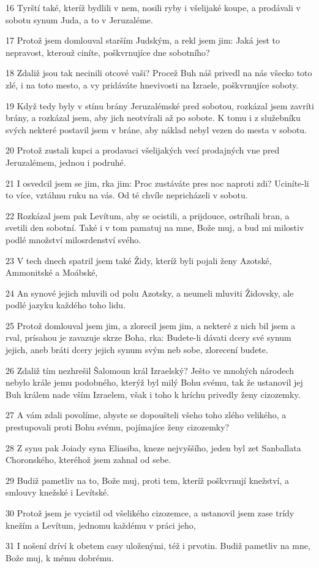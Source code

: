 \par 16 Tyrští také, kteríž bydlili v nem, nosili ryby i všelijaké koupe, a prodávali v sobotu synum Juda, a to v Jeruzaléme.
\par 17 Protož jsem domlouval starším Judským, a rekl jsem jim: Jaká jest to nepravost, kterouž ciníte, poškvrnujíce dne sobotního?
\par 18 Zdaliž jsou tak necinili otcové vaši? Procež Buh náš privedl na nás všecko toto zlé, i na toto mesto, a vy pridáváte hnevivosti na Izraele, poškvrnujíce soboty.
\par 19 Když tedy byly v stínu brány Jeruzalémské pred sobotou, rozkázal jsem zavríti brány, a rozkázal jsem, aby jich neotvírali až po sobote. K tomu i z služebníku svých nekteré postavil jsem v bráne, aby náklad nebyl vezen do mesta v sobotu.
\par 20 Protož zustali kupci a prodavaci všelijakých vecí prodajných vne pred Jeruzalémem, jednou i podruhé.
\par 21 I osvedcil jsem se jim, rka jim: Proc zustáváte pres noc naproti zdi? Uciníte-li to více, vztáhnu ruku na vás. Od té chvíle nepricházeli v sobotu.
\par 22 Rozkázal jsem pak Levítum, aby se ocistili, a prijdouce, ostríhali bran, a svetili den sobotní. Také i v tom pamatuj na mne, Bože muj, a bud mi milostiv podlé množství milosrdenství svého.
\par 23 V tech dnech spatril jsem také Židy, kteríž byli pojali ženy Azotské, Ammonitské a Moábské,
\par 24 An synové jejich mluvili od polu Azotsky, a neumeli mluviti Židovsky, ale podlé jazyku každého toho lidu.
\par 25 Protož domlouval jsem jim, a zlorecil jsem jim, a nekteré z nich bil jsem a rval, prísahou je zavazuje skrze Boha, rka: Budete-li dávati dcery své synum jejich, aneb bráti dcery jejich synum svým neb sobe, zlorecení budete.
\par 26 Zdaliž tím nezhrešil Šalomoun král Izraelský? Ješto ve mnohých národech nebylo krále jemu podobného, kterýž byl milý Bohu svému, tak že ustanovil jej Buh králem nade vším Izraelem, však i toho k hríchu privedly ženy cizozemky.
\par 27 A vám zdali povolíme, abyste se dopoušteli všeho toho zlého velikého, a prestupovali proti Bohu svému, pojímajíce ženy cizozemky?
\par 28 Z synu pak Joiady syna Eliasiba, kneze nejvyššího, jeden byl zet Sanballata Choronského, kteréhož jsem zahnal od sebe.
\par 29 Budiž pametliv na to, Bože muj, proti tem, kteríž poškvrnují knežství, a smlouvy knežské i Levítské.
\par 30 Protož jsem je vycistil od všelikého cizozemce, a ustanovil jsem zase trídy knežím a Levítum, jednomu každému v práci jeho,
\par 31 I nošení dríví k obetem casy uloženými, též i prvotin. Budiž pametliv na mne, Bože muj, k mému dobrému.


